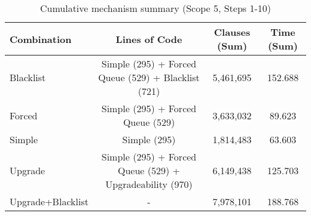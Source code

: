 \begin{table}[htbp]
\centering
\begin{tabular}{|l|c|c|c|}
\hline
\textbf{Combination} & \textbf{Lines of Code} & \textbf{Clauses (Sum)} & \textbf{Time (Sum)} \\
\hline
Blacklist & Simple (295) + Forced Queue (529) + Blacklist (721) & 5,461,695 & 152.688 \\
Forced & Simple (295) + Forced Queue (529) & 3,633,032 & 89.623 \\
Simple & Simple (295) & 1,814,483 & 63.603 \\
Upgrade & Simple (295) + Forced Queue (529) + Upgradeability (970) & 6,149,438 & 125.703 \\
Upgrade+Blacklist & - & 7,978,101 & 188.768 \\
\hline
\end{tabular}
\caption{Cumulative mechanism summary (Scope 5, Steps 1-10)}
\label{tab:cumulative_mechanism_summary_steps_10}
\end{table}